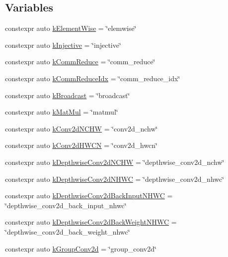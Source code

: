 \subsection*{Variables}
\begin{DoxyCompactItemize}
\item 
constexpr auto \hyperlink{namespacetopi_ac1b34ed59d38a5f5338bee6b2cad42be}{k\+Element\+Wise} = \char`\"{}elemwise\char`\"{}
\item 
constexpr auto \hyperlink{namespacetopi_a60f05ec416e4618d25ad00dd9f536934}{k\+Injective} = \char`\"{}injective\char`\"{}
\item 
constexpr auto \hyperlink{namespacetopi_ae57dced7232a8ef1f94cd669c72e0093}{k\+Comm\+Reduce} = \char`\"{}comm\+\_\+reduce\char`\"{}
\item 
constexpr auto \hyperlink{namespacetopi_aaf18db0af5abc7dd13818115bac402bc}{k\+Comm\+Reduce\+Idx} = \char`\"{}comm\+\_\+reduce\+\_\+idx\char`\"{}
\item 
constexpr auto \hyperlink{namespacetopi_a794b9155e9ba9d1c9c42a1cff1fb645f}{k\+Broadcast} = \char`\"{}broadcast\char`\"{}
\item 
constexpr auto \hyperlink{namespacetopi_a06a6892f5e4681142f0c08b0af32499d}{k\+Mat\+Mul} = \char`\"{}matmul\char`\"{}
\item 
constexpr auto \hyperlink{namespacetopi_a8e842c3723b0ad6b2fb82ecb98b8a1c2}{k\+Conv2d\+N\+C\+HW} = \char`\"{}conv2d\+\_\+nchw\char`\"{}
\item 
constexpr auto \hyperlink{namespacetopi_a0a63c3748ea82acd5eef2b608c83e165}{k\+Conv2d\+H\+W\+CN} = \char`\"{}conv2d\+\_\+hwcn\char`\"{}
\item 
constexpr auto \hyperlink{namespacetopi_a12dcb067885b89c536ae094569e8e3fb}{k\+Depthwise\+Conv2d\+N\+C\+HW} = \char`\"{}depthwise\+\_\+conv2d\+\_\+nchw\char`\"{}
\item 
constexpr auto \hyperlink{namespacetopi_a00fa259c7a4c72504f9ac906062e9ebc}{k\+Depthwise\+Conv2d\+N\+H\+WC} = \char`\"{}depthwise\+\_\+conv2d\+\_\+nhwc\char`\"{}
\item 
constexpr auto \hyperlink{namespacetopi_a5c20df4059bd823e003dfede11762473}{k\+Depthwise\+Conv2d\+Back\+Input\+N\+H\+WC} = \char`\"{}depthwise\+\_\+conv2d\+\_\+back\+\_\+input\+\_\+nhwc\char`\"{}
\item 
constexpr auto \hyperlink{namespacetopi_a1676476ab91b608188918f5d267f1d07}{k\+Depthwise\+Conv2d\+Back\+Weight\+N\+H\+WC} = \char`\"{}depthwise\+\_\+conv2d\+\_\+back\+\_\+weight\+\_\+nhwc\char`\"{}
\item 
constexpr auto \hyperlink{namespacetopi_a4147e63b5ce67e3340ed5096bf6b9455}{k\+Group\+Conv2d} = \char`\"{}group\+\_\+conv2d\char`\"{}
\end{DoxyCompactItemize}


